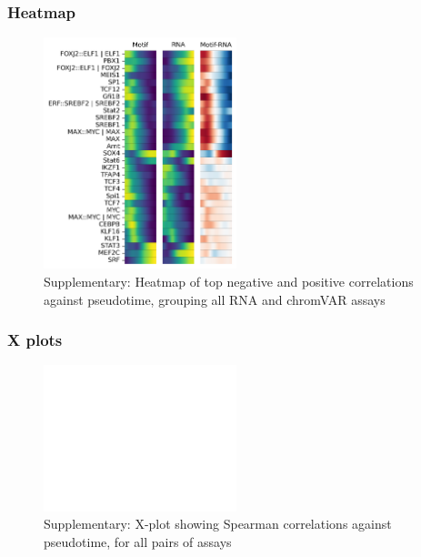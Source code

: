 \documentclass[a4paper]{article}
\begin{document}
\FloatBarrier
\subsubsection{Heatmap}

\begin{figure}[!htb]
  \centering
  \includegraphics[width=0.5\textwidth]{../figures/hematopoiesis/MKP_40_110_single_smooth_none_heatmap_grouped_assays.png}
  \caption{Supplementary: Heatmap of top negative and positive correlations against pseudotime, grouping all RNA and chromVAR assays}
\end{figure}

\FloatBarrier
\subsubsection{X plots}
 
\begin{figure}[!htb]
  \centering
  \includegraphics[width=0.5\textwidth]{../figures/hematopoiesis/MKP_40_110_smooth_none_detailed_X_plot.png}
  \caption{Supplementary: X-plot showing Spearman correlations against pseudotime, for all pairs of assays}
\end{figure}
\end{document}
